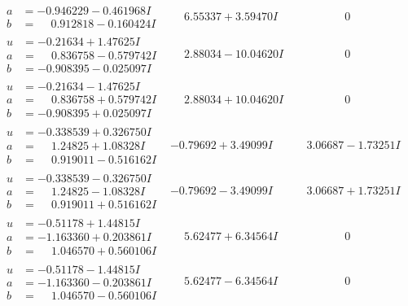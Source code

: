\documentclass[1p]{elsarticle_modified}
\theoremstyle{definition}
\begin{document}
$$\begin{array}{c|c|c}
\begin{aligned}
a &= -0.946229 - 0.461968 I \\
b &= \phantom{-}0.912818 - 0.160424 I\end{aligned}
 & \phantom{-}6.55337 + 3.59470 I & \phantom{-0.000000 } 0 \\ \hline\begin{aligned}
u &= -0.21634 + 1.47625 I \\
a &= \phantom{-}0.836758 - 0.579742 I \\
b &= -0.908395 - 0.025097 I\end{aligned}
 & \phantom{-}2.88034 - 10.04620 I & \phantom{-0.000000 } 0 \\ \hline\begin{aligned}
u &= -0.21634 - 1.47625 I \\
a &= \phantom{-}0.836758 + 0.579742 I \\
b &= -0.908395 + 0.025097 I\end{aligned}
 & \phantom{-}2.88034 + 10.04620 I & \phantom{-0.000000 } 0 \\ \hline\begin{aligned}
u &= -0.338539 + 0.326750 I \\
a &= \phantom{-}1.24825 + 1.08328 I \\
b &= \phantom{-}0.919011 - 0.516162 I\end{aligned}
 & -0.79692 + 3.49099 I & \phantom{-}3.06687 - 1.73251 I \\ \hline\begin{aligned}
u &= -0.338539 - 0.326750 I \\
a &= \phantom{-}1.24825 - 1.08328 I \\
b &= \phantom{-}0.919011 + 0.516162 I\end{aligned}
 & -0.79692 - 3.49099 I & \phantom{-}3.06687 + 1.73251 I \\ \hline\begin{aligned}
u &= -0.51178 + 1.44815 I \\
a &= -1.163360 + 0.203861 I \\
b &= \phantom{-}1.046570 + 0.560106 I\end{aligned}
 & \phantom{-}5.62477 + 6.34564 I & \phantom{-0.000000 } 0 \\ \hline\begin{aligned}
u &= -0.51178 - 1.44815 I \\
a &= -1.163360 - 0.203861 I \\
b &= \phantom{-}1.046570 - 0.560106 I\end{aligned}
 & \phantom{-}5.62477 - 6.34564 I & \phantom{-0.000000 } 0 \\ \hline\begin{aligned}

\end{aligned}
\end{array}$$
\end{document}
